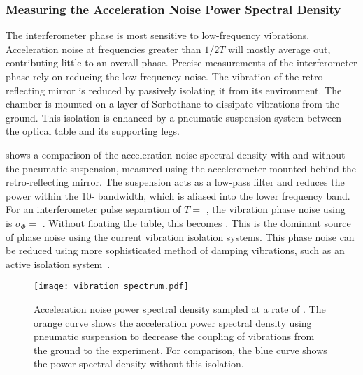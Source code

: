 \subsubsection{Measuring the Acceleration Noise Power Spectral Density}
The interferometer phase is most sensitive to low-frequency
vibrations. Acceleration noise at frequencies greater than \(1/2T\)
will mostly average out, contributing little to an overall phase.
Precise measurements of the interferometer phase rely on reducing the
low frequency noise. The vibration of the retro-reflecting mirror is
reduced by passively isolating it from its environment. The
chamber is mounted on a layer of Sorbothane to dissipate
vibrations from the ground. This isolation is enhanced by a
pneumatic suspension system between the optical table and its
supporting legs. 
\par\noindent
{} shows a comparison of the acceleration noise spectral density with and
without the pneumatic suspension, measured using
the accelerometer mounted behind the retro-reflecting mirror. The suspension acts as a
low-pass filter and reduces the power within the
10- bandwidth, which is aliased into the lower
frequency band. For an interferometer pulse separation of \(T =
\) , the
vibration phase noise using~ is \(\sigma_\Phi =\) . Without
floating the table, this becomes . This is the dominant
source of phase noise using the current vibration isolation systems.
This phase noise can be reduced using more sophisticated method of damping vibrations, such as an active
isolation system~\cite{Zhou2012}.
\begin{figure}[htpb!]
  \centering
  \texttt{[image: vibration\_spectrum.pdf]}
  \caption[Acceleration noise power spectral density.]{Acceleration
  noise power spectral density sampled at a rate of
. The orange curve shows the acceleration
power spectral density using pneumatic suspension to decrease the
coupling of vibrations from the ground to the experiment. For
comparison, the blue curve shows the power spectral density without
this isolation.}
  \label{fig:vibration_spectrum}
\end{figure}
